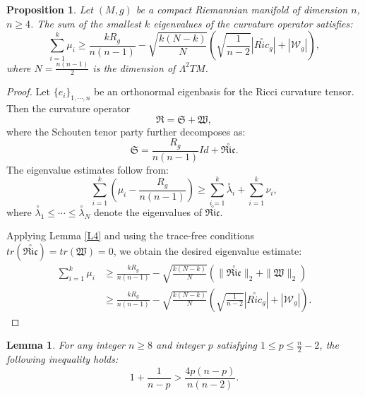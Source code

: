 \documentclass[12pt, twoside]{article}
\newtheorem{lemma}[theorem]{Lemma}
\newtheorem{proposition}[theorem]{Proposition}
\theoremstyle{definition}
\numberwithin{equation}{section}
\def \la {\lambda}
\begin{document}
\begin{proposition}\label{P8}
		Let $(M,g)$ be a compact Riemannian  manifold of dimension $n$, $n\geq4$. The sum of the smallest $k$ eigenvalues of the curvature operator satisfies:
			$$\sum_{i=1}^{k}\mu_{i}\geq \frac{kR_{g}}{n(n-1)}-\sqrt{\frac{k(N-k)}{N}}(\sqrt{\frac{ 1}{n-2}}|\overset{\circ}{Ric}_{g}|+|\mathcal{W}_{g}|),$$
			where $N=\frac{n(n-1)}{2}$ is the dimension of $\Lambda^2TM$.
		\end{proposition}
	\begin{proof}
Let $\{e_{i}\}_{1,\cdots,n}$ be an orthonormal eigenbasis for the Ricci curvature tensor. Then the curvature operator $$\mathfrak{R} = \mathfrak{S}+\mathfrak{W},$$
where the Schouten tenor party further decomposes as:
$$\mathfrak{S}=\frac{R_{g}}{n(n-1)}Id+\overset{\circ}{\mathfrak{Ric}}.$$
The eigenvalue estimates follow from:
$$\sum_{i=1}^{k}(\mu_{i}-\frac{R_{g}}{n(n-1)})\geq\sum_{i=1}^{k}\overset{\circ}{\la}_{i}+\sum_{i=1}^{k}\nu_{i},$$
where $\overset{\circ}{\la}_{1}\leq\cdots\leq\overset{\circ}{\la}_{N}$ denote the eigenvalues of $\overset{\circ}{\mathfrak{Ric}}$.

Applying Lemma \ref{L4} and using the trace-free conditions $tr(\overset{\circ}{\mathfrak{Ric}}) = tr(\mathfrak{W}) = 0$, we obtain the desired eigenvalue estimate:
\begin{equation*}
\begin{split}
\sum_{i=1}^{k}\mu_{i}&\geq\frac{kR_{g}}{n(n-1)}-\sqrt{\frac{k(N-k)}{N}}(\|\overset{\circ}{\mathfrak{Ric}}\|_{2}+\|\mathfrak{W}\|_{2})\\
&\geq \frac{kR_{g}}{n(n-1)}-\sqrt{\frac{k(N-k)}{N}}(\sqrt{\frac{ 1}{n-2}}|\overset{\circ}{Ric}_{g}|+|\mathcal{W}_{g}|).
\end{split}
\end{equation*}
\end{proof}	
\begin{lemma}\label{L5}
For any integer $n \geq 8$ and integer $p$ satisfying $1 \leq p \leq \frac{n}{2}-2$, the following inequality holds:
$$1+\frac{1}{n-p}>\frac{4p(n-p)}{n(n-2)}.$$
\end{lemma}
\end{document}
